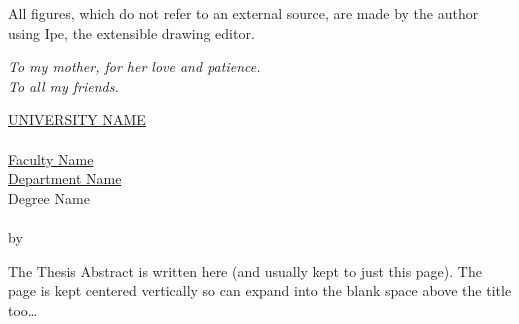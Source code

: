 All figures, which do not refer to an external
source, are made by the author using Ipe, the extensible drawing editor.









































\cleardoublepage
\thispagestyle{empty}
\begin{flushright}
  \itshape
  To my mother, for her love and patience. \\
  To all my friends.
\end{flushright}


\cleardoublepage
\thispagestyle{plain}
\null
\vfill
\begin{center}
  \makeatletter
  \MakeUppercase{\href{https://href.com}{University Name}} \\
  \vspace{20pt}
  {\huge \textit{\abstractname}} \\
  \bigskip
  \href{https://href.com}{Faculty Name} \\
  \href{https://href.com}{Department Name} \\
  \bigskip
  Degree Name \\
  \bigskip
  \textbf{\@title} \\
  \medskip
  by \@author \\
  \bigskip
  \makeatother
\end{center}
The Thesis Abstract is written here (and usually kept to just this page). The
page is kept centered vertically so can expand into the blank space above the
title too\ldots
\vfill
\null


